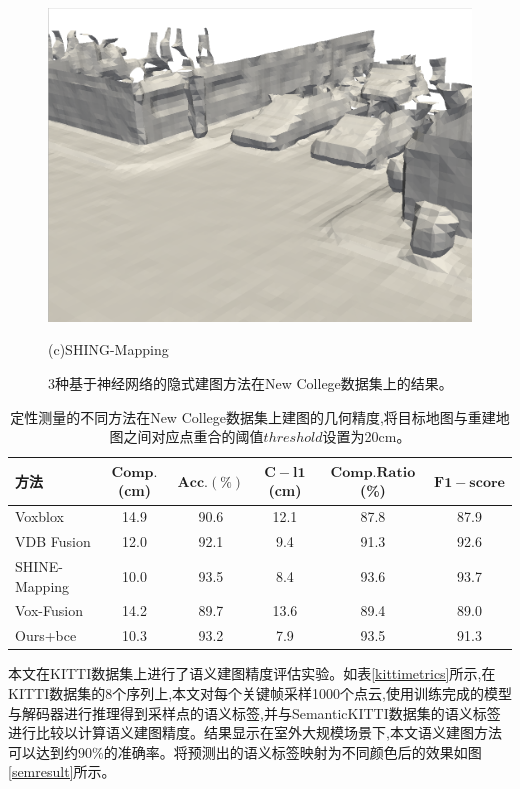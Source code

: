 \begin{figure}[htbp]
\begin{minipage}{0.5\linewidth}
    \includegraphics[width=1\linewidth]{figures/mai_2_shine.png}
    \end{minipage}\caption*{(c)SHING-Mapping}
    \caption{3种基于神经网络的隐式建图方法在New College数据集上的结果。}\label{ncdresult}
\end{figure}

\begin{table}[htbp]
    \centering
    \caption{定性测量的不同方法在New College数据集上建图的几何精度,将目标地图与重建地图之间对应点重合的阈值$threshold$设置为20cm。}\label{ncdmetric}
    \begin{tabular}[htbp]{llccccc}
        \toprule
        \multicolumn{2}{l}{方法} & $\mathbf{Comp.}$(cm) & $\mathbf{Acc.}(\%)$ & $\mathbf{C-l1}$(cm) &  $\mathbf{Comp. Ratio}$(\%) &$\mathbf{F1-score}$\\
        \midrule
        \multicolumn{2}{l}{Voxblox} & 14.9 & 90.6 &12.1 &87.8&87.9\\
        \multicolumn{2}{l}{VDB Fusion} & 12.0&92.1&9.4&91.3&92.6 \\
        \multicolumn{2}{l}{SHINE-Mapping} & 10.0&93.5&8.4&93.6&93.7 \\
        \multicolumn{2}{l}{Vox-Fusion} & 14.2 & 89.7& 13.6&89.4&89.0\\
        \midrule
        \multicolumn{2}{l}{Ours+bce} &10.3& 93.2 & 7.9 &93.5&91.3\\
        \bottomrule
    \end{tabular}
\end{table}
本文在KITTI数据集上进行了语义建图精度评估实验。如表\ref{kittimetrics}所示,在KITTI数据集的8个序列上,本文对每个关键帧采样1000个点云,使用训练完成的模型与解码器进行推理得到采样点的语义标签,并与SemanticKITTI数据集的语义标签进行比较以计算语义建图精度。结果显示在室外大规模场景下,本文语义建图方法可以达到约90\%的准确率。将预测出的语义标签映射为不同颜色后的效果如图\ref{semresult}所示。

